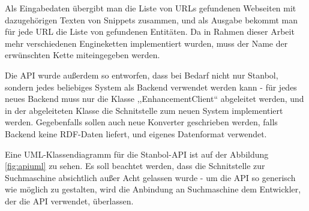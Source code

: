 Als Eingabedaten übergibt man die Liste von URLs gefundenen Webseiten mit dazugehörigen Texten von Snippets zusammen, und als Ausgabe bekommt man für jede URL die Liste von gefundenen Entitäten. Da in Rahmen dieser Arbeit mehr verschiedenen Engineketten implementiert wurden, muss der Name der erwünschten Kette miteingegeben werden.

Die API wurde außerdem so entworfen, dass bei Bedarf nicht nur Stanbol, sondern jedes beliebiges System als Backend verwendet werden kann - für jedes neues Backend muss nur die Klasse ,,EnhancementClient`` abgeleitet werden, und in der abgeleiteten Klasse die Schnitstelle zum neuen System implementiert werden. Gegebenfalls sollen auch neue Konverter geschrieben werden, falls Backend keine RDF-Daten liefert, und eigenes Datenformat verwendet.

Eine UML-Klassendiagramm für die Stanbol-API ist auf der Abbildung \ref{fig:apiuml} zu sehen. Es soll beachtet werden, dass die Schnitstelle zur Suchmaschine absichtlich außer Acht gelassen wurde - um die API so generisch wie möglich zu gestalten, wird die Anbindung an Suchmaschine dem Entwickler, der die API verwendet, überlassen. 

